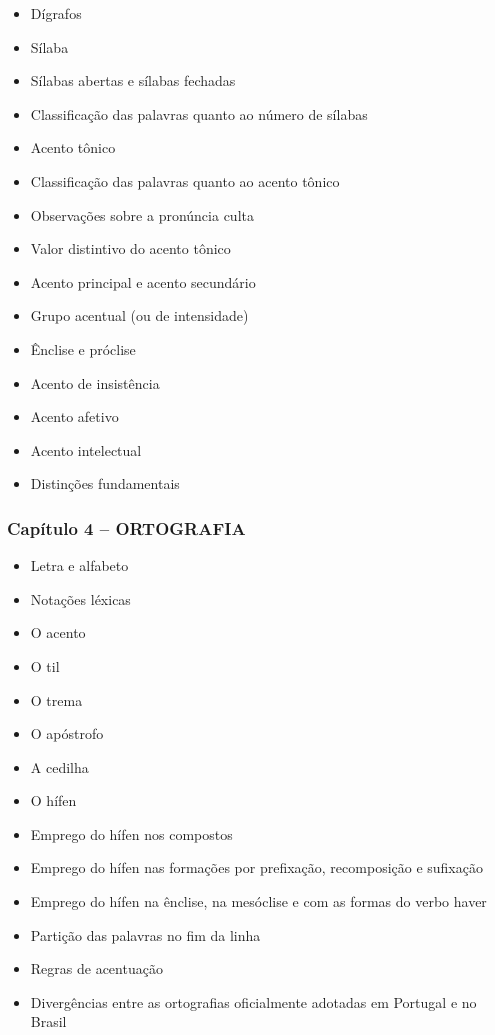 \documentclass[a4paper,12pt]{article}[abntex2]
\begin{document}
\begin{itemize}
    \item Dígrafos
    \item Sílaba
    \item Sílabas abertas e sílabas fechadas
    \item Classificação das palavras quanto ao número de sílabas
    \item Acento tônico
    \item Classificação das palavras quanto ao acento tônico
    \item Observações sobre a pronúncia culta
    \item Valor distintivo do acento tônico
    \item Acento principal e acento secundário
    \item Grupo acentual (ou de intensidade)
    \item Ênclise e próclise
    \item Acento de insistência
    \item Acento afetivo
    \item Acento intelectual
    \item Distinções fundamentais
\end{itemize}

\subsubsection*{Capítulo 4 – ORTOGRAFIA}
\begin{itemize}
    \item Letra e alfabeto
    \item Notações léxicas
    \item O acento
    \item O til
    \item O trema
    \item O apóstrofo
    \item A cedilha
    \item O hífen
    \item Emprego do hífen nos compostos
    \item Emprego do hífen nas formações por prefixação, recomposição e sufixação
    \item Emprego do hífen na ênclise, na mesóclise e com as formas do verbo haver
    \item Partição das palavras no fim da linha
    \item Regras de acentuação
    \item Divergências entre as ortografias oficialmente adotadas em Portugal e no Brasil
\end{itemize}
\end{document}
